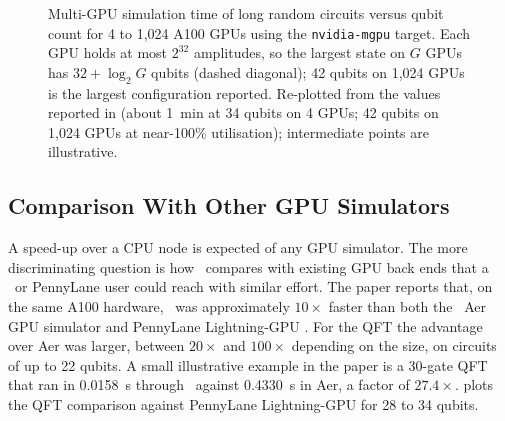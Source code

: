 \begin{figure}[htbp]
\centering
{}
\caption{Multi-GPU simulation time of long random circuits versus qubit count for 4 to 1,024 A100 GPUs using the \texttt{nvidia-mgpu} target. Each GPU holds at most $2^{32}$ amplitudes, so the largest state on $G$ GPUs has $32+\log_{2}G$ qubits (dashed diagonal); 42 qubits on 1,024 GPUs is the largest configuration reported. Re-plotted from the values reported in \cite{guo2025qgear} (about \SI{1}{\minute} at 34 qubits on 4 GPUs; 42 qubits on 1,024 GPUs at near-100\% utilisation); intermediate points are illustrative.}
\label{fig:qgear:scaling}
\end{figure}

\subsection{Comparison With Other GPU Simulators}\label{sec:qgear:results-comparison}

A speed-up over a CPU node is expected of any GPU simulator. The more discriminating question is how \qgear\ compares with existing GPU back ends that a \qiskit\ or PennyLane user could reach with similar effort. The paper \cite{guo2025qgear} reports that, on the same A100 hardware, \qgear\ was approximately $10\times$ faster than both the \qiskit\ Aer GPU simulator and PennyLane Lightning-GPU \cite{asadi2024pennylanelightning}. For the QFT the advantage over Aer was larger, between $20\times$ and $100\times$ depending on the size, on circuits of up to 22 qubits. A small illustrative example in the paper is a 30-gate QFT that ran in \SI{0.0158}{\second} through \qgear\ against \SI{0.4330}{\second} in Aer, a factor of $27.4\times$.  plots the QFT comparison against PennyLane Lightning-GPU for 28 to 34 qubits.

